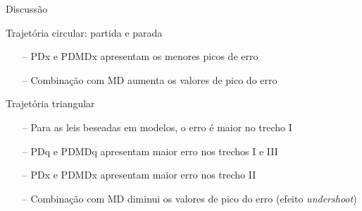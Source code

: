 \documentclass[25pt,landscape]{beamer}
\begin{document}
\begin{frame}{Discussão}
    \begin{block}{Trajetória circular: partida e parada}
        \begin{itemize}
            \item[--] PDx e PDMDx apresentam os menores picos de erro \\[5pt]
            \item[--] Combinação com MD aumenta os valores de pico do erro \\[5pt]
        \end{itemize}
    \end{block}
    \pause
    \begin{block}{Trajetória triangular}
        \begin{itemize}
            \item[--] Para as leis beseadas em modelos, o erro é maior no trecho I \\[5pt]
            \item[--] PDq e PDMDq apresentam maior erro nos trechos I e III \\[5pt]
            \item[--] PDx e PDMDx apresentam maior erro nos trecho II \\[5pt]
            \item[--] Combinação com MD diminui os valores de pico do erro (efeito \emph{undershoot}) \\[5pt]
        \end{itemize}
    \end{block}
\end{frame}
\end{document}

